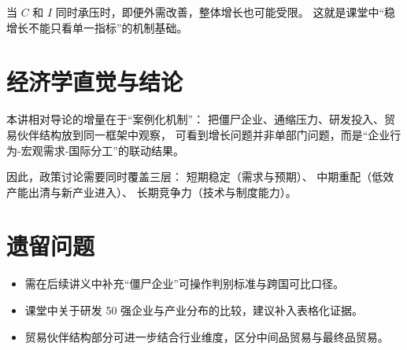 \documentclass[UTF8,11pt,a4paper]{ctexart}
\begin{document}
当 $C$ 和 $I$ 同时承压时，即便外需改善，整体增长也可能受限。
这就是课堂中“稳增长不能只看单一指标”的机制基础。

\section{经济学直觉与结论}

本讲相对导论的增量在于“案例化机制”：
把僵尸企业、通缩压力、研发投入、贸易伙伴结构放到同一框架中观察，
可看到增长问题并非单部门问题，而是“企业行为-宏观需求-国际分工”的联动结果。

因此，政策讨论需要同时覆盖三层：
短期稳定（需求与预期）、
中期重配（低效产能出清与新产业进入）、
长期竞争力（技术与制度能力）。

\section{遗留问题}

\begin{itemize}
  \item 需在后续讲义中补充“僵尸企业”可操作判别标准与跨国可比口径。
  \item 课堂中关于研发 50 强企业与产业分布的比较，建议补入表格化证据。
  \item 贸易伙伴结构部分可进一步结合行业维度，区分中间品贸易与最终品贸易。
\end{itemize}
\end{document}
